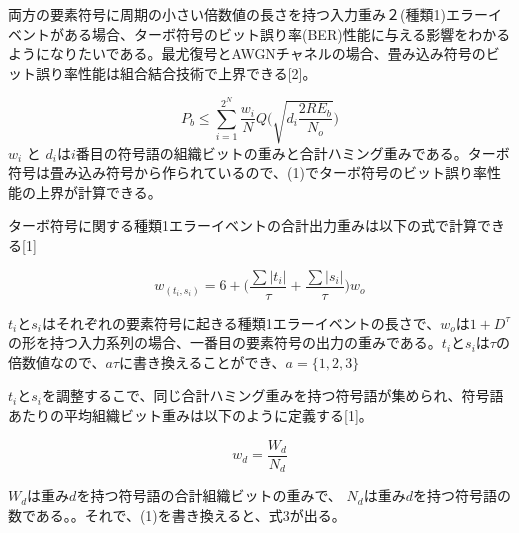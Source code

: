 \documentclass[20 pts]{article}
\begin{document}
両方の要素符号に周期の小さい倍数値の長さを持つ入力重み２(種類1)エラーイベントがある場合、ターボ符号のビット誤り率(BER)性能に与える影響をわかるようになりたいである。最尤復号とAWGNチャネルの場合、畳み込み符号のビット誤り率性能は組合結合技術で上界できる[2]。


\begin{equation}
P_b \leq \sum_{i=1}^{2^N} \frac{w_i}{N}Q\Bigg( \sqrt{d_i\frac{2RE_b}{N_o}}\Bigg)
\end{equation}
 $w_i$ と $d_i$は$i$番目の符号語の組織ビットの重みと合計ハミング重みである。ターボ符号は畳み込み符号から作られているので、(1)でターボ符号のビット誤り率性能の上界が計算できる。



ターボ符号に関する種類1エラーイベントの合計出力重みは以下の式で計算できる[1]

\begin{equation}
w_{(t_i,s_i)}=6+\Bigg( \frac{\sum \left|t_i\right|}{\tau} + \frac{\sum \left|s_i\right|}{\tau} \Bigg)w_o
\end{equation}

$t_i$と$s_i$はそれぞれの要素符号に起きる種類1エラーイベントの長さで、$w_o$は$1+D^\tau$の形を持つ入力系列の場合、一番目の要素符号の出力の重みである。$t_i$と$s_i$は$\tau$の倍数値なので、$a\tau$に書き換えることができ、$a =\{1,2,3\}$

$t_i$と$s_i$を調整するこで、同じ合計ハミング重みを持つ符号語が集められ、符号語あたりの平均組織ビット重みは以下のように定義する[1]。　

$$ w_d=\frac{W_d}{N_d}$$

$W_d$は重み$d$を持つ符号語の合計組織ビットの重みで、 $N_d$は重み$d$を持つ符号語の数である。。それで、(1)を書き換えると、式3が出る。
\end{document}
